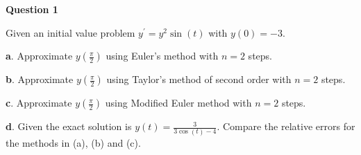 

\begin{tcolorbox}
\textbf{Question 1} 

Given an initial value problem $y^{\prime}=y^{2} \sin (t)$ with $y(0)=-3$.


\textbf a. Approximate $y\left(\frac{\pi}{2}\right)$ using Euler's method with $n=2$ steps.



\textbf b. Approximate $y\left(\frac{\pi}{2}\right)$ using Taylor's method of second order with $n=2$ steps.



\textbf c. Approximate $y\left(\frac{\pi}{2}\right)$ using Modified Euler method with $n=2$ steps.



\textbf d. Given the exact solution is $y(t)=\frac{3}{3 \cos (t)-4}$. Compare the relative errors for the methods in (a), (b) and (c).






\end{tcolorbox}

